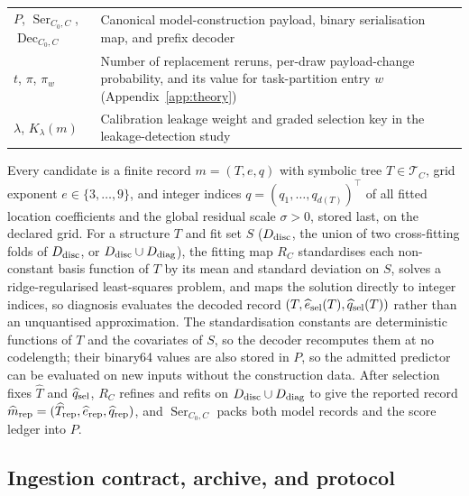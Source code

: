 \begin{table}[t]
\begin{tabularx}{\columnwidth}{@{}>{\raggedright\arraybackslash}p{}>{\raggedright\arraybackslash}X@{}}
\(P\), \(\operatorname{Ser}_{C_0,C}\), \(\operatorname{Dec}_{C_0,C}\) & Canonical model-construction payload, binary serialisation map, and prefix decoder \\
\(t\), \(\pi\), \(\pi_w\) & Number of replacement reruns, per-draw payload-change probability, and its value for task-partition entry \(w\) (Appendix~\ref{app:theory}) \\
\(\lambda\), \(K_\lambda(m)\) & Calibration leakage weight and graded selection key in the leakage-detection study \\
\bottomrule
\end{tabularx}
\end{table}

Every candidate is a finite record \(m=(T,e,q)\) with symbolic tree \(T\in\mathcal T_C\), grid exponent \(e\in\{3,\ldots,9\}\), and integer indices \(q=(q_1,\ldots,q_{d(T)})^\top\) of all fitted location coefficients and the global residual scale \(\sigma>0\), stored last, on the declared grid. For a structure \(T\) and fit set \(S\) (\(D_{\rm disc}\), the union of two cross-fitting folds of \(D_{\rm disc}\), or \(D_{\rm disc}\cup D_{\rm diag}\)), the fitting map \(R_C\) standardises each non-constant basis function of \(T\) by its mean and standard deviation on \(S\), solves a ridge-regularised least-squares problem, and maps the solution directly to integer indices, so diagnosis evaluates the decoded record \((T,\widehat e_{\rm sel}(T),\widehat q_{\rm sel}(T))\) rather than an unquantised approximation. The standardisation constants are deterministic functions of \(T\) and the covariates of \(S\), so the decoder recomputes them at no codelength; their binary64 values are also stored in \(P\), so the admitted predictor can be evaluated on new inputs without the construction data. After selection fixes \(\widehat T\) and \(\widehat q_{\rm sel}\), \(R_C\) refines and refits on \(D_{\rm disc}\cup D_{\rm diag}\) to give the reported record \(\widehat m_{\rm rep}=(\widehat T_{\rm rep},\widehat e_{\rm rep},\widehat q_{\rm rep})\), and \(\operatorname{Ser}_{C_0,C}\) packs both model records and the score ledger into \(P\).

\subsection{Ingestion contract, archive, and protocol}\label{sec:contract}

